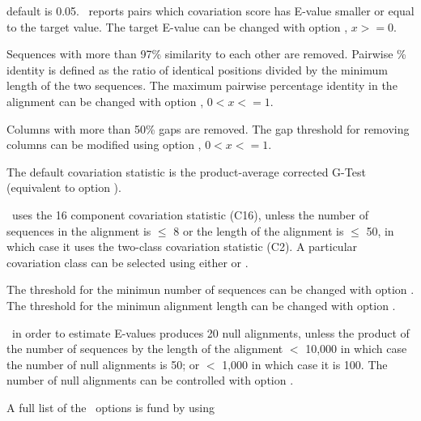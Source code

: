\begin{sreitems}{}
\item[\emprog{Target E-value:}]default is 0.05. \rscape\, reports
  pairs which covariation score has E-value smaller or equal to the
  target value.  The target E-value can be changed with option
  , $x >= 0$.

\item[\emprog{Pairwise percent identity:}]Sequences with more than
  97\% similarity to each other are removed.  Pairwise \% identity is
  defined as the ratio of identical positions divided by the minimum
  length of the two sequences. The maximum pairwise percentage
  identity in the alignment can be changed with option , $0<x<=1$.

\item[\emprog{Gaps in columns}]Columns with more than 50\% gaps are
  removed. The gap threshold for removing columns can be modified
  using option  , $0<x<=1$.

\item[\emprog{Covariation statistic}]The default covariation statistic
  is the product-average corrected G-Test (equivalent to option
  ).

\item[\emprog{Covariation Class}]\rscape\ uses the 16 component
  covariation statistic (C16), unless the number of sequences in the
  alignment is $\leq$ 8 or the length of the alignment is $\leq$ 50,
  in which case it uses the two-class covariation statistic (C2). A
  particular covariation class can be selected using either
   or .

  The threshold for the minimun number of sequences can be changed
  with option .  The threshold for the minimun
  alignment length can be changed with option .

\item[\emprog{Null alignments:}]\rscape\ in order to estimate E-values
  produces 20 null alignments, unless the product of the number of
  sequences by the length of the alignment $<$ 10,000 in which case
  the number of null alignments is 50; or $<$ 1,000 in which case it
  is 100. The number of null alignments can be controlled with option
  .
\end{sreitems}

A full list of the \rscape\ options is fund by using

